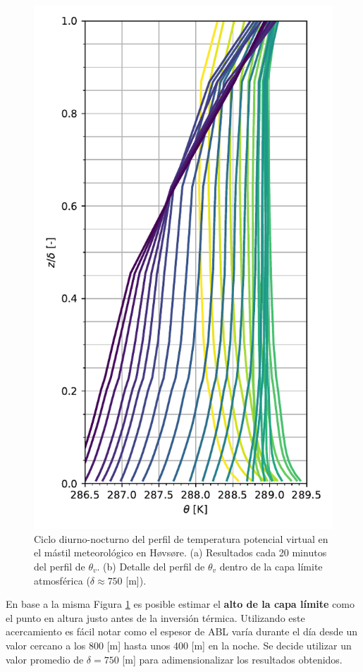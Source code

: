 \begin{figure}[H]
\begin{minipage}{0.5\linewidth}
		\includegraphics[width=0.86\linewidth,trim={0cm 5mm 0cm 0cm},clip]{Imagenes/06/hov/temp_profile}%
	\end{minipage}%
	
	\caption{Ciclo diurno-nocturno del perfil de temperatura potencial virtual en el mástil meteorológico en Høvsøre. (a) Resultados cada 20 minutos del perfil de $\theta_v$. (b) Detalle del perfil de $\theta_v$ dentro de la capa límite atmosférica ($\delta \approx 750$ [m]).}
	\label{fig:06_hov_pbl}
\end{figure}

En base a la misma Figura \ref{fig:06_hov_pbl} es posible estimar el \textbf{alto de la capa límite} como el punto en altura justo antes de la inversión térmica. Utilizando este acercamiento es fácil notar como el espesor de ABL varía durante el día desde un valor cercano a los 800 [m] hasta unos 400 [m] en la noche. Se decide utilizar un valor promedio de $\delta = 750$ [m] para adimensionalizar los resultados obtenidos.
